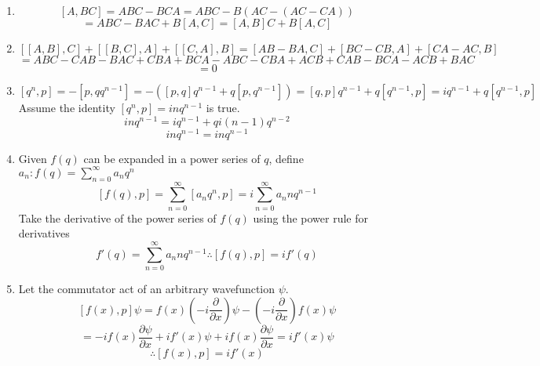 \begin{sol}
\begin{enumerate}[label=\textbf{(\alph*)}]
\item
$$[A,BC]=ABC-BCA=ABC-B(AC-(AC-CA))$$$$=ABC-BAC+B[A,C]=[A,B]C+B[A,C]$$
\item
$$[[A,B],C]+[[B,C],A]+[[C,A],B]=[AB-BA,C]+[BC-CB,A]+[CA-AC,B]$$ 
$$=ABC-CAB-BAC+CBA+BCA-ABC-CBA+ACB+CAB-BCA-ACB+BAC$$ 
$$=0$$ \item
$$[q^n,p]=-[p,qq^{n-1}]=-([p,q]q^{n-1}+q[p,q^{n-1}])=[q,p]q^{n-1}+q[q^{n-1},p]=iq^{n-1}+q[q^{n-1},p]$$
Assume the identity $[q^n,p]=inq^{n-1}$ is true.
$$inq^{n-1}=iq^{n-1}+qi(n-1)q^{n-2}$$ $$inq^{n-1}=inq^{n-1}$$
\item
Given $f(q)$ can be expanded in a power series of $q$, define $a_n:f(q)=\sum_{n=0}^\infty a_nq^n$
$$[f(q),p]=\sum_{n=0}^\infty[a_nq^n,p]=i\sum_{n=0}^\infty a_nnq^{n-1}$$ 
Take the derivative of the power series of $f(q)$ using the power rule for derivatives
$$f'(q)=\sum_{n=0}^\infty a_n nq^{n-1}\therefore[f(q),p]=if'(q)$$
\item
Let the commutator act of an arbitrary wavefunction $\psi$.
$$[f(x),p]\psi=f(x)\left(-i\frac{\partial}{\partial x}\right)\psi-\left(-i\frac{\partial}{\partial x}\right)f(x)\psi$$
$$=-if(x)\frac{\partial\psi}{\partial x}+if'(x)\psi+if(x)\frac{\partial\psi}{\partial x}=if'(x)\psi$$ $$\therefore[f(x),p]=if'(x)$$ 
\end{enumerate}
\end{sol}
